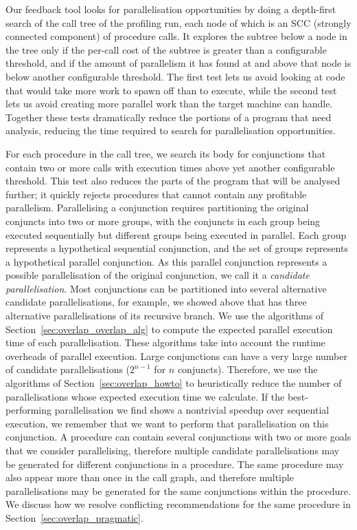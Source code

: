 Our feedback tool looks for parallelisation opportunities
by doing a depth-first search of the call tree of the profiling run,
each node of which is an SCC (strongly connected component) of procedure
calls.
It explores the subtree below a node in the tree
only if the per-call cost of the subtree is greater than a configurable
threshold,
and if the amount of parallelism it has found at and above that node
is below another configurable threshold.
The first test lets us avoid looking at code
that would take more work to spawn off than to execute,
while the second test lets us avoid creating
more parallel work than the target machine can handle.
Together these tests dramatically reduce the portions of a program that need
analysis,
reducing the time required to search for parallelisation opportunities.

For each procedure in the call tree,
we search its body for conjunctions that contain two or more calls with
execution times above yet another configurable threshold.
This test also reduces the parts of the program that will be analysed
further;
it quickly rejects procedures that cannot contain any profitable
parallelism.
Parallelising a conjunction
requires partitioning the original conjuncts into two or more groups,
with the conjuncts in each group being executed sequentially
but different groups being executed in parallel.
Each group represents a hypothetical sequential conjunction,
and the set of groups represents a hypothetical parallel conjunction.
As this parallel conjunction represents a possible parallelisation of the
original conjunction, we call it a \emph{candidate parallelisation}.
Most conjunctions can be partitioned into several alternative candidate
parallelisations,
for example, we showed above that \mapfoldl has three alternative
parallelisations of its recursive branch.
We use the algorithms of Section~\ref{sec:overlap_overlap_alg}
to compute the expected parallel execution time of each parallelisation.
These algorithms take into account the runtime overheads of parallel execution.
Large conjunctions can have a very large number of
candidate parallelisations ($2^{n-1}$ for $n$ conjuncts).
Therefore,
we use the algorithms of Section~\ref{sec:overlap_howto}
to heuristically reduce the number of parallelisations whose expected
execution time we calculate.
If the best-performing parallelisation we find
shows a nontrivial speedup over sequential execution,
we remember that we want to perform that parallelisation on this conjunction.
A procedure can contain several conjunctions with two or more goals that we
consider parallelising,
therefore multiple candidate parallelisations may be generated for different
conjunctions in a procedure.
The same procedure may also appear more than once in the call graph,
and therefore multiple parallelisations may be generated for the same
conjunctions within the procedure.
We discuss how we resolve conflicting recommendations for the same procedure
in Section~\ref{sec:overlap_pragmatic}.

